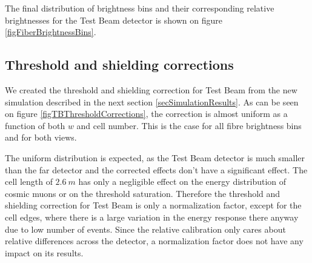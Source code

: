 \documentclass[12pt,a4paper]{article}
\begin{document}
The final distribution of brightness bins and their corresponding relative brightnesses for the Test Beam detector is shown on figure \ref{figFiberBrightnessBins}.

\subsection{Threshold and shielding corrections}
We created the threshold and shielding correction for Test Beam from the new simulation described in the next section \ref{secSimulationResults}. As can be seen on figure \ref{figTBThresholdCorrections}, the correction is almost uniform as a function of both $w$ and cell number. This is the case for all fibre brightness bins and for both views.

The uniform distribution is expected, as the Test Beam detector is much smaller than the far detector and the corrected effects don't have a significant effect. The cell length of $2.6\ \unit{m}$ has only a negligible effect on the energy distribution of cosmic muons or on the threshold saturation. Therefore the threshold and shielding correction for Test Beam is only a normalization factor, except for the cell edges, where there is a large variation in the energy response there anyway due to low number of events. Since the relative calibration only cares about relative differences across the detector, a normalization factor does not have any impact on its results.
\end{document}
